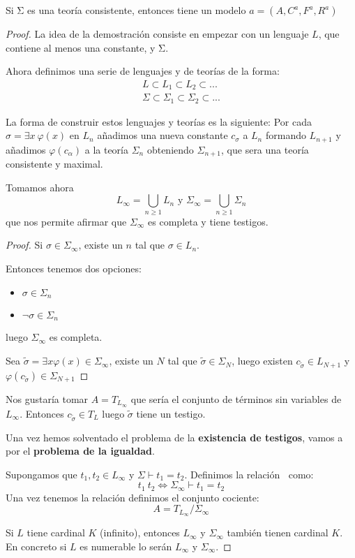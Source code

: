 \begin{theorem}
Si Σ es una teoría consistente, entonces tiene un modelo $a=(A,C^a,F^a,R^a)$
\end{theorem}
\begin{proof}
La idea de la demostración consiste en empezar con un lenguaje $L$, que contiene al menos una constante, y Σ.

Ahora definimos una serie de lenguajes y de teorías de la forma:
\[\begin{array}{l}
L \subset L_1 \subset L_2 \subset ... \\
Σ \subset Σ_1 \subset Σ_2 \subset ...
\end{array}\]

La forma de construir estos lenguajes y teorías es la siguiente: Por cada $σ=\exists x\ \varphi(x)$ en $L_n$ añadimos una nueva constante $c_σ$ a $L_n$ formando $L_{n+1}$ y añadimos $\varphi(c_α)$ a la teoría $Σ_n$ obteniendo $Σ_{n+1}$, que sera una teoría consistente y maximal.

Tomamos ahora
\[L_{\infty} = \bigcup_{n \geq 1} L_n \text{ y } Σ_{\infty} = \bigcup_{n \geq 1} Σ_n\]
que nos permite afirmar que $Σ_{\infty}$ es completa y tiene testigos.
\begin{proof}
Si $σ \in Σ_{\infty}$, existe un $n$ tal que $σ\in L_n$.

Entonces tenemos dos opciones:
\begin{itemize}
\item $σ \in Σ_n$
\item $\neg σ \in Σ_n$
\end{itemize}
luego $Σ_{\infty}$ es completa.

Sea $\tilde{σ} = \exists x \varphi(x) \in Σ_{\infty}$, existe un $N$ tal que $\tilde{σ} \in Σ_N$, luego existen $c_{\tilde{σ}} \in L_{N+1}$ y $\varphi(c_{\tilde{σ}})\in Σ_{N+1}$
\end{proof}

Nos gustaría tomar $A=T_{L_{\infty}}$ que sería el conjunto de términos sin variables de $L_{\infty}$. Entonces $c_{\tilde{σ}} \in T_L$ luego $\tilde{σ}$ tiene un testigo.

Una vez hemos solventado el problema de la \textbf{existencia de testigos}, vamos a por el \textbf{problema de la igualdad}.

Supongamos que $t_1,t_2 \in L_{\infty}$ y $Σ \vdash t_1=t_2$. Definimos la relación $~$ como:
\[t_1 ~ t_2 \iff Σ_{\infty} \vdash t_1=t_2 \]
Una vez tenemos la relación definimos el conjunto cociente:
\[A = T_{L_{\infty}}/Σ_{\infty}\]

\obs Si $L$ tiene cardinal $K$ (infinito), entonces $L_{\infty}$ y $Σ_{\infty}$ también tienen cardinal $K$. En concreto si $L$ es numerable lo serán $L_{\infty}$ y $Σ_{\infty}$.
\end{proof}

